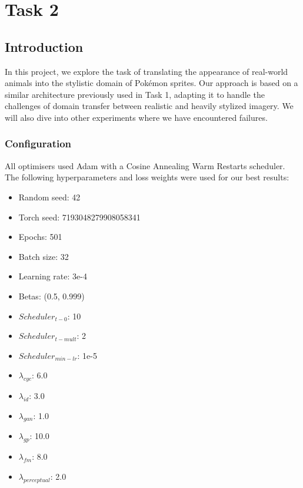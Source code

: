 \documentclass[twoside,english,notitlepage]{report}
\begin{document}
\chapter{Task 2}
\section{Introduction}
In this project, we explore the task of translating the appearance of real-world animals into the stylistic domain of Pokémon sprites. Our approach is based on a similar architecture previously used in Task 1, adapting it to handle the challenges of domain transfer between realistic and heavily stylized imagery. We will also dive into other experiments where we have encountered failures.

\subsection{Configuration}\label{task2:configuration}

All optimisers used Adam with a Cosine Annealing Warm Restarts scheduler. The following hyperparameters and loss weights were used for our best results:

\begin{multicols}{3}
    \begin{itemize}
        \item Random seed: 42
        \item Torch seed: 7193048279908058341
        \item Epochs: 501
        \item Batch size: 32
        \item Learning rate: 3e-4
        \item Betas: (0.5, 0.999)
        \item $Scheduler_{t-0}$: 10
        \item $Scheduler_{t-mult}$: 2
        \item $Scheduler_{min-lr}$: 1e-5
        \item $\lambda_{cyc}$: 6.0
        \item $\lambda_{id}$: 3.0
        \item $\lambda_{gan}$: 1.0
        \item $\lambda_{gp}$: 10.0
        \item $\lambda_{fm}$: 8.0
        \item $\lambda_{perceptual}$: 2.0
    \end{itemize}
\end{multicols}
\end{document}
